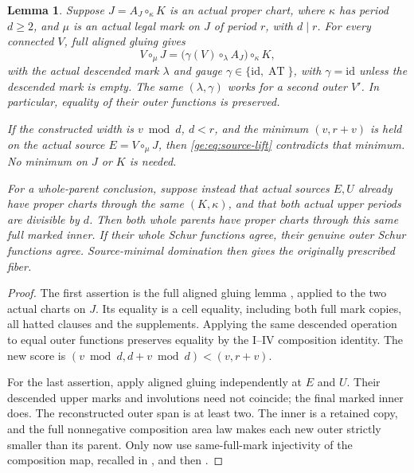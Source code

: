 \documentclass[11pt,a4paper]{amsart}
\numberwithin{equation}{section}
\theoremstyle{plain}
\newtheorem{lemma}[theorem]{Lemma}
\theoremstyle{definition}
\newcommand{\AT}{\operatorname{AT}}
\begin{document}
\begin{lemma}\label{ge:aligned-finish}
Suppose \(J=A_J\circ_\kappa K\) is an actual proper chart, where
\(\kappa\) has period \(d\ge2\), and \(\mu\) is an actual legal mark on
\(J\) of period \(r\), with \(d\mid r\).  For every connected \(V\),
full aligned gluing gives
\begin{equation}\label{ge:eq:source-lift}
 V\circ_\mu J=
 \bigl(\gamma(V)\circ_\lambda A_J\bigr)\circ_\kappa K,
\end{equation}
with the actual descended mark \(\lambda\) and gauge \(\gamma\in\{\mathrm{id},\AT\}\), with
\(\gamma=\mathrm{id}\) unless the descended mark is empty.  The same \((\lambda,\gamma)\) works for a second
outer \(V'\).  In particular, equality of their outer functions is
preserved.

If the constructed width is \(v\bmod d\), \(d<r\), and the minimum
\((v,r+v)\) is held on the actual source \(E=V\circ_\mu J\), then
\eqref{ge:eq:source-lift} contradicts that minimum.  No minimum on \(J\)
or \(K\) is needed.

For a whole-parent conclusion, suppose instead that actual sources
\(E,U\) already have proper charts through the same \((K,\kappa)\),
and that both actual upper periods are divisible by \(d\).  Then both
whole parents have proper charts through this same full marked inner.
If their whole Schur functions agree, their genuine outer Schur functions
agree.  Source-minimal domination then gives the originally prescribed
fiber.
\end{lemma}
\begin{proof}
The first assertion is the full aligned gluing lemma
\cite[Aligned-composition lemma]{Shields2026Gluing}, applied to
the two actual charts on \(J\).  Its equality is a cell equality, including
both full mark copies, all hatted clauses and the supplements.  Applying
the same descended operation to equal outer functions preserves equality
by the I--IV composition identity.  The new score is
\((v\bmod d,d+v\bmod d)<(v,r+v)\).

For the last assertion, apply aligned gluing independently at \(E\) and
\(U\).  Their descended upper marks and involutions need not coincide;
the final marked inner does.  The reconstructed outer span is at least
two.  The inner is a retained copy, and the full nonnegative composition
area law makes each new outer strictly smaller than its parent.  Only
now use same-full-mark injectivity of the composition map, recalled in
, and then
\cite[Source-minimal domination theorem]{Shields2026Gluing}.
\end{proof}
\end{document}
